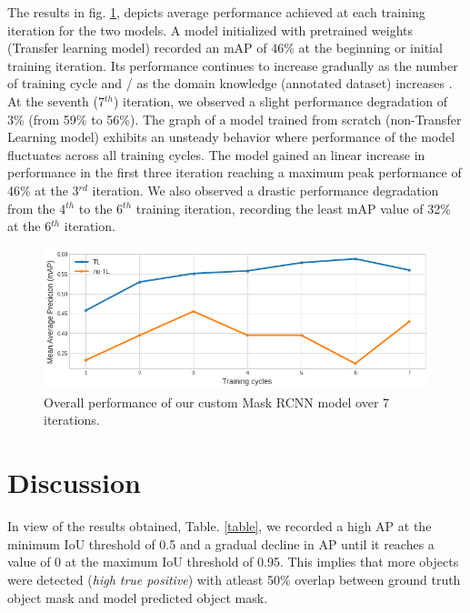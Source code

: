 \documentclass[conference]{IEEEtran}
\begin{document}
		The results in fig. \ref{mAP-cycles}, depicts average performance achieved at each training iteration for the two models. A model initialized with pretrained weights (Transfer learning model) recorded an mAP of 46\% at the beginning or initial training iteration. Its performance continues to increase
gradually as the number of training cycle and / as the domain knowledge (annotated dataset) increases . At the seventh (7$ ^{th} $) iteration, we observed a slight performance degradation of 3\% (from 59\% to 56\%). The graph of a model trained from scratch (non-Transfer Learning model) exhibits an unsteady behavior where performance of the model fluctuates across all training cycles. The model gained an linear increase in performance in the first three iteration reaching a maximum peak performance of 46\% at the 3$ ^{rd} $ iteration. We
 also observed a drastic performance degradation from the 4$ ^{th} $ to the 6$ ^{th} $ training iteration, recording the least mAP value of 32\% at the 6$ ^{th} $ iteration.
	
		\begin{figure}[htbp]
			\centering
			\includegraphics[width=1\linewidth]{mAP-cycles.png}
			\caption{Overall performance of our custom Mask RCNN model over 7 iterations.}
			\label{mAP-cycles}
		\end{figure}
	

\section{Discussion}
	
	In view of the results obtained, Table. \ref{table}, we recorded a high AP at the minimum IoU threshold of 0.5 and a gradual decline in AP until it reaches a value of 0 at the maximum
 IoU threshold of 0.95. This implies that more objects were detected (\textit{high true positive}) with
 atleast 50\% overlap between ground truth object mask and model predicted object mask.\\
		
\end{document}
